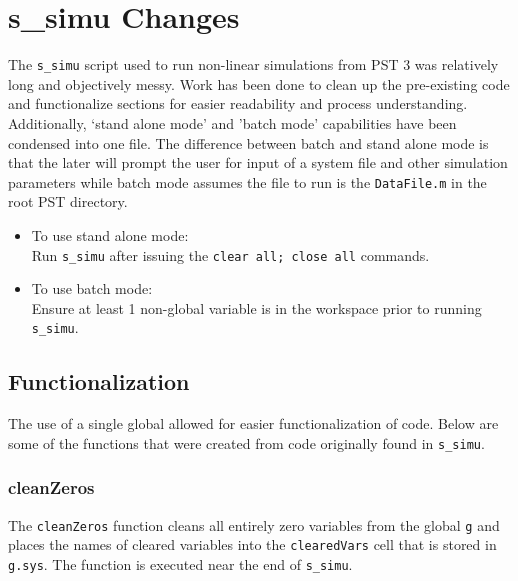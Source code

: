\pagebreak
\section{s\_simu Changes}
The \verb|s_simu| script used to run non-linear simulations from PST 3 was relatively long and objectively messy.
Work has been done to clean up the pre-existing code and functionalize sections for easier readability and process understanding.
Additionally, `stand alone mode' and 'batch mode' capabilities have been condensed into one file.
The difference between batch and stand alone mode is that the later will prompt the user for input of a system file and other simulation parameters while batch mode assumes the file to run is the \verb|DataFile.m| in the root PST directory.
\begin{itemize}
 em
\item To use stand alone mode:\\
Run \verb|s_simu| after issuing the \verb|clear all; close all| commands.
\item To use batch mode:\\
Ensure at least 1 non-global variable is in the workspace prior to running \verb|s_simu|.
\end{itemize}

\subsection{Functionalization}
The use of a single global allowed for easier functionalization of code.
Below are some of the functions that were created from code originally found in \verb|s_simu|.

\subsubsection{cleanZeros}  
The \verb|cleanZeros| function cleans all entirely zero variables from the global \verb|g| and places the names of cleared variables into the \verb|clearedVars| cell that is stored in \verb|g.sys|.
The function is executed near the end of \verb|s_simu|.

